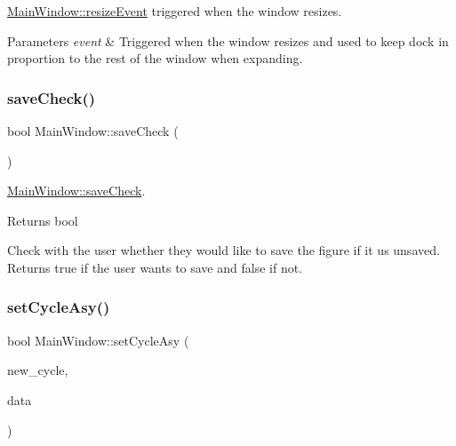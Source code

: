 \mbox{\hyperlink{class_main_window_ae12f8f63791595567b6250f8bb002bda}{Main\+Window\+::resize\+Event}} triggered when the window resizes. 


\begin{DoxyParams}{Parameters}
{\em event} & Triggered when the window resizes and used to keep dock in proportion to the rest of the window when expanding. \\
\hline
\end{DoxyParams}
\mbox{\label{class_main_window_ae2defb68c51e884b7031693b20bdd556}} 
\subsubsection{\texorpdfstring{save\+Check()}{saveCheck()}}
{\footnotesize\ttfamily bool Main\+Window\+::save\+Check (\begin{DoxyParamCaption}{ }\end{DoxyParamCaption})}



\mbox{\hyperlink{class_main_window_ae2defb68c51e884b7031693b20bdd556}{Main\+Window\+::save\+Check}}. 

\begin{DoxyReturn}{Returns}
bool
\end{DoxyReturn}
Check with the user whether they would like to save the figure if it us unsaved. Returns true if the user wants to save and false if not. \mbox{\label{class_main_window_a633c8594fbb906b2e914a4b3bbf50d97}} 
\subsubsection{\texorpdfstring{set\+Cycle\+Asy()}{setCycleAsy()}}
{\footnotesize\ttfamily bool Main\+Window\+::set\+Cycle\+Asy (\begin{DoxyParamCaption}\item[{const Gi\+Na\+C\+::ex \&}]{new\+\_\+cycle,  }\item[{const struct \mbox{\hyperlink{structcycle_style_data}{cycle\+Style\+Data}} \&}]{data }\end{DoxyParamCaption})}



